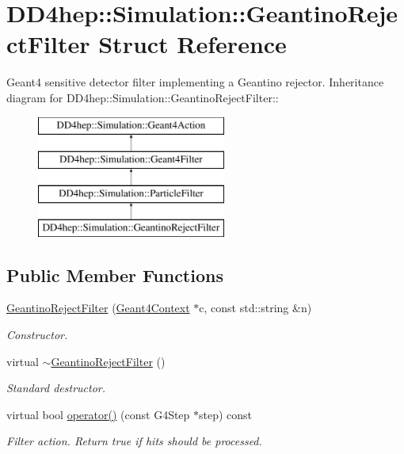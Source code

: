 \hypertarget{struct_d_d4hep_1_1_simulation_1_1_geantino_reject_filter}{
\section{DD4hep::Simulation::GeantinoRejectFilter Struct Reference}
\label{struct_d_d4hep_1_1_simulation_1_1_geantino_reject_filter}
}


Geant4 sensitive detector filter implementing a Geantino rejector.  
Inheritance diagram for DD4hep::Simulation::GeantinoRejectFilter::\begin{figure}[H]
\begin{center}
\leavevmode
\includegraphics[height=4cm]{struct_d_d4hep_1_1_simulation_1_1_geantino_reject_filter}
\end{center}
\end{figure}
\subsection*{Public Member Functions}
\begin{DoxyCompactItemize}
\item 
\hyperlink{struct_d_d4hep_1_1_simulation_1_1_geantino_reject_filter_a1c59ff0c23002a3c6325c3ba74c92f35}{GeantinoRejectFilter} (\hyperlink{class_d_d4hep_1_1_simulation_1_1_geant4_context}{Geant4Context} $\ast$c, const std::string \&n)
\begin{DoxyCompactList}\small\item\em Constructor. \item\end{DoxyCompactList}\item 
virtual \hyperlink{struct_d_d4hep_1_1_simulation_1_1_geantino_reject_filter_a566d0c7a2368a3358c321279be8ac3ae}{$\sim$GeantinoRejectFilter} ()
\begin{DoxyCompactList}\small\item\em Standard destructor. \item\end{DoxyCompactList}\item 
virtual bool \hyperlink{struct_d_d4hep_1_1_simulation_1_1_geantino_reject_filter_aa8d8f1469357f1ed18be0ed4ab7348b9}{operator()} (const G4Step $\ast$step) const 
\begin{DoxyCompactList}\small\item\em Filter action. Return true if hits should be processed. \item\end{DoxyCompactList}\end{DoxyCompactItemize}


